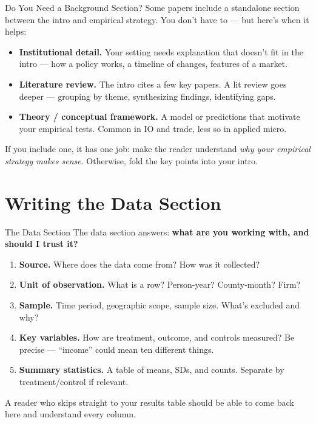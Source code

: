\begin{frame}{Do You Need a Background Section?}
  \small
  Some papers include a standalone section between the intro and empirical strategy. You don't have to --- but here's when it helps:

  \vspace{4pt}

  \begin{itemize}\setlength\itemsep{2pt}
    \item \textbf{Institutional detail.} Your setting needs explanation that doesn't fit in the intro --- how a policy works, a timeline of changes, features of a market.
    \item \textbf{Literature review.} The intro cites a few key papers. A lit review goes deeper --- grouping by theme, synthesizing findings, identifying gaps.
    \item \textbf{Theory / conceptual framework.} A model or predictions that motivate your empirical tests. Common in IO and trade, less so in applied micro.
  \end{itemize}

  \vspace{4pt}

  If you include one, it has one job: make the reader understand \emph{why your empirical strategy makes sense}. Otherwise, fold the key points into your intro.
\end{frame}

\section{Writing the Data Section}

\begin{frame}{The Data Section}
  The data section answers: \textbf{what are you working with, and should I trust it?}

  \vspace{6pt}

  \begin{enumerate}
    \item \textbf{Source.} Where does the data come from? How was it collected?
    \item \textbf{Unit of observation.} What is a row? Person-year? County-month? Firm?
    \item \textbf{Sample.} Time period, geographic scope, sample size. What's excluded and why?
    \item \textbf{Key variables.} How are treatment, outcome, and controls measured? Be precise --- ``income'' could mean ten different things.
    \item \textbf{Summary statistics.} A table of means, SDs, and counts. Separate by treatment/control if relevant.
  \end{enumerate}

  \vspace{6pt}

  A reader who skips straight to your results table should be able to come back here and understand every column.
\end{frame}

